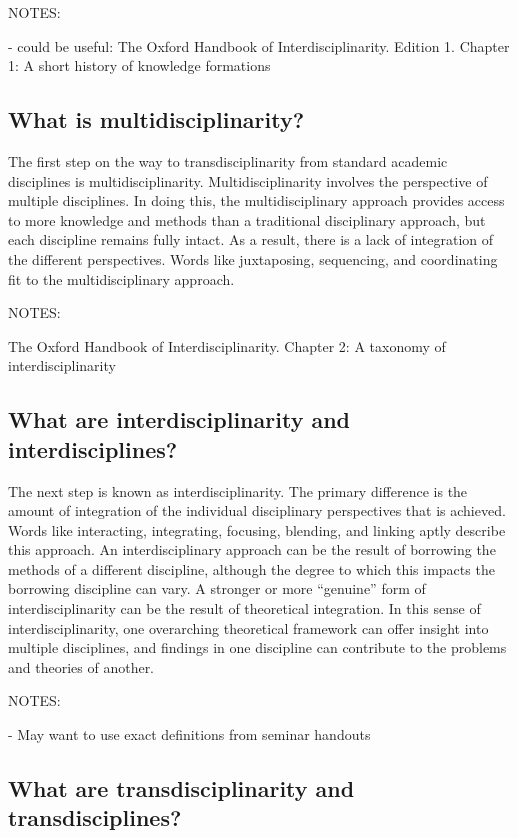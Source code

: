\documentclass{lps}
\begin{document}
NOTES:

- could be useful: The Oxford Handbook of Interdisciplinarity. Edition 1.
Chapter 1: A short history of knowledge formations

\subsection{What is multidisciplinarity?}

The first step on the way to transdisciplinarity from standard academic
disciplines is multidisciplinarity. Multidisciplinarity involves the
perspective of multiple disciplines. In doing this, the multidisciplinary
approach provides access to more knowledge and methods than a traditional
disciplinary approach, but each discipline remains fully intact. As a result,
there is a lack of integration of the different perspectives. Words like
juxtaposing, sequencing, and coordinating fit to the multidisciplinary
approach.

NOTES:

The Oxford Handbook of Interdisciplinarity. Chapter 2: A taxonomy of interdisciplinarity

\subsection{What are interdisciplinarity and interdisciplines?}

The next step is known as interdisciplinarity. The primary difference is the
amount of integration of the individual disciplinary perspectives that is
achieved. Words like interacting, integrating, focusing, blending, and linking
aptly describe this approach. An interdisciplinary approach can be the result
of borrowing the methods of a different discipline, although the degree to
which this impacts the borrowing discipline can vary. A stronger or more
``genuine'' form of interdisciplinarity can be the result of theoretical
integration. In this sense of interdisciplinarity, one overarching theoretical
framework can offer insight into multiple disciplines, and findings in one
discipline can contribute to the problems and theories of another.

NOTES:

- May want to use exact definitions from seminar handouts

\subsection{What are transdisciplinarity and transdisciplines?}
\end{document}
